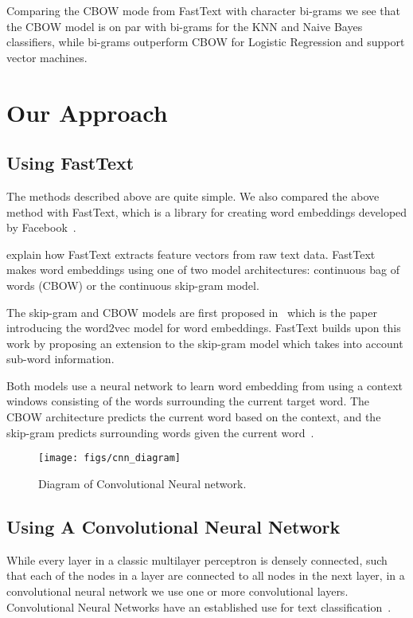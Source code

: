 \documentclass[11pt,a4paper]{article}
\begin{document}
Comparing the CBOW mode from FastText with character bi-grams we see that the CBOW model is on par with bi-grams for the KNN and Naive Bayes classifiers, while bi-grams outperform  CBOW for Logistic Regression and support vector machines.

 \section{Our Approach}

\subsection{Using FastText}

The methods described above are quite simple. We also compared the above method with FastText, which is a library for creating word embeddings developed by Facebook~\cite{BagOfTricks}.

 explain how FastText extracts feature vectors from raw text data. FastText makes word embeddings using one of two model architectures: continuous bag of words (CBOW) or the continuous skip-gram model.

The skip-gram and CBOW models are first proposed in~\cite{EfficientWordRepresentations} which is the paper introducing the word2vec model for word embeddings. FastText builds upon this work by proposing an extension to the skip-gram model which takes into account sub-word information.

Both models use a neural network to learn word embedding from using a context windows consisting of the words surrounding the current target word. The CBOW architecture predicts the current word based on the context, and the skip-gram predicts surrounding words given the current word~\cite{EfficientWordRepresentations}.


\begin{figure}
  \centering
  \texttt{[image: figs/cnn\_diagram]}
  \caption{Diagram of Convolutional Neural network.}
  \label{cnn}
\end{figure}

\subsection{Using A Convolutional Neural Network}

While every layer in a classic multilayer perceptron is densely connected, such that each of the nodes in a layer are connected to all nodes in the next layer, in a convolutional neural network we use one or more convolutional layers. Convolutional Neural Networks have an established use for text classification~\cite{textcnn_google}.
\end{document}
